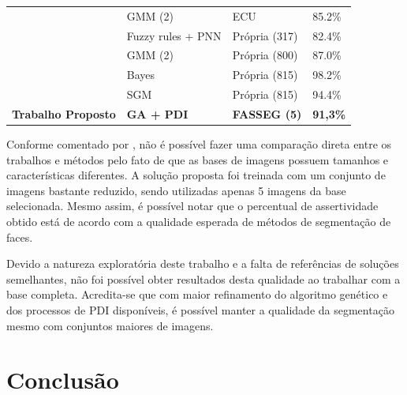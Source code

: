\documentclass[12pt,oneside,a4paper,english,french,spanish,brazil,]{abntex2}
\begin{document}
\begin{table}
\begin{tabular}{llll}
                             & GMM (2)                        & ECU                   & 85.2\%              \\
\citet{anagnostopoulos:2003} & Fuzzy rules + PNN               & Própria (317) & 82.4\%              \\
\citet{caetano:2002}         & GMM (2)                        & Própria (800) & 87.0\%              \\
\citet{jayaram:2004}         & Bayes                          & Própria (815) & 98.2\%              \\
                             & SGM                            & Própria (815) & 94.4\%              \\ \hline
\textbf{Trabalho Proposto} & \textbf{GA + PDI} & \textbf{FASSEG (5)} & \textbf{91,3\%} \\ \hline
\end{tabular}
\end{table}

Conforme comentado por \citet{kakumanu:2007}, não é possível fazer uma comparação direta entre os trabalhos e métodos pelo fato de que as bases de imagens possuem tamanhos e características diferentes. A solução proposta foi treinada com um conjunto de imagens bastante reduzido, sendo utilizadas apenas 5 imagens da base selecionada. Mesmo assim, é possível notar que o percentual de assertividade obtido está de acordo com a qualidade esperada de métodos de segmentação de faces.

Devido a natureza exploratória deste trabalho e a falta de referências de soluções semelhantes, não foi possível obter resultados desta qualidade ao trabalhar com a base completa. Acredita-se que com maior refinamento do algoritmo genético e dos processos de PDI disponíveis, é possível manter a qualidade da segmentação mesmo com conjuntos maiores de imagens.


% 

\chapter{Conclusão}
\label{chap:Conclusao}
\label{chap:ultimo}
\end{document}
